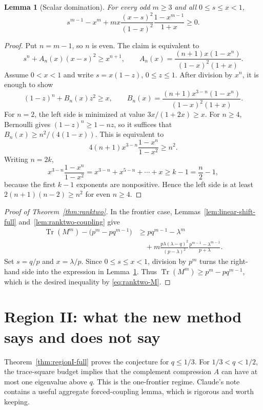 \documentclass[11pt]{article}
\newtheorem{lemma}[theorem]{Lemma}
\newcommand{\Tr}{\operatorname{Tr}}
\begin{document}
\begin{lemma}[Scalar domination]\label{lem:ranktwo-scalar}
For every odd $m\ge3$ and all $0\le s\le x<1$,
\[
        s^{m-1}-x^m
        +m x\frac{(x-s)^2}{(1-x)^2}\frac{1-x^{m-1}}{1+x}
        \ge0.
\]
\end{lemma}

\begin{proof}
Put $n=m-1$, so $n$ is even.  The claim is equivalent to
\[
        s^n+A_n(x)(x-s)^2\ge x^{n+1},
        \qquad
        A_n(x)=\frac{(n+1)x(1-x^n)}{(1-x)^2(1+x)}.
\]
Assume $0<x<1$ and write $s=x(1-z)$, $0\le z\le1$.  After division by $x^n$, it is enough to show
\[
        (1-z)^n+B_n(x)z^2\ge x,
        \qquad
        B_n(x)=\frac{(n+1)x^{3-n}(1-x^n)}{(1-x)^2(1+x)}.
\]
For $n=2$, the left side is minimized at value $3x/(1+2x)\ge x$.  For $n\ge4$, Bernoulli gives $(1-z)^n\ge1-nz$, so it suffices that $B_n(x)\ge n^2/(4(1-x))$.  This is equivalent to
\[
        4(n+1)x^{3-n}\frac{1-x^n}{1-x^2}\ge n^2.
\]
Writing $n=2k$,
\[
        x^{3-n}\frac{1-x^n}{1-x^2}
        =x^{3-n}+x^{5-n}+\cdots+x
        \ge k-1=\frac n2-1,
\]
because the first $k-1$ exponents are nonpositive.  Hence the left side is at least $2(n+1)(n-2)\ge n^2$ for even $n\ge4$.
\end{proof}

\begin{proof}[Proof of Theorem~\ref{thm:ranktwo}]
In the frontier case, Lemmas~\ref{lem:linear-shift-full} and~\ref{lem:ranktwo-coupling} give
\[
\begin{aligned}
\Tr(M^m)-\bigl(p^m-pq^{m-1}\bigr)
&\ge pq^{m-1}-\lambda^m \\
&\quad +m\frac{p\lambda(\lambda-q)^2}{(p-\lambda)^2}
      \frac{p^{m-1}-\lambda^{m-1}}{p+\lambda}.
\end{aligned}
\]
Set $s=q/p$ and $x=\lambda/p$.  Since $0\le s\le x<1$, division by $p^m$ turns the right-hand side into the expression in Lemma~\ref{lem:ranktwo-scalar}.  Thus $\Tr(M^m)\ge p^m-pq^{m-1}$, which is the desired inequality by \eqref{eq:ranktwo-M}.
\end{proof}

\section{Region II: what the new method says and does not say}\label{sec:regionII}

Theorem~\ref{thm:regionI-full} proves the conjecture for $q\le1/3$.  For $1/3<q<1/2$, the trace-square budget implies that the complement compression $A$ can have at most one eigenvalue above $q$.  This is the one-frontier regime.  Claude's note contains a useful aggregate forced-coupling lemma, which is rigorous and worth keeping.
\end{document}
